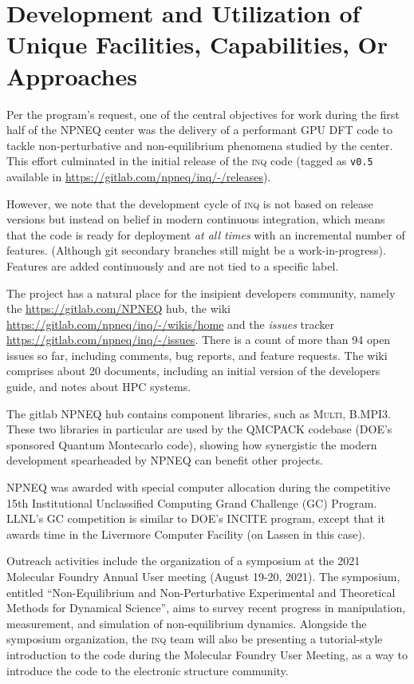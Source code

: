 \section{Development and Utilization of Unique Facilities, Capabilities, Or Approaches}
\label{sec:development}


Per the program's request, one of the central objectives for work during the first half of the NPNEQ center was the delivery of a performant GPU DFT code to tackle non-perturbative and non-equilibrium phenomena studied by the center.
This effort culminated in the initial release of the \textsc{inq} code (tagged as \texttt{v0.5} available in \url{https://gitlab.com/npneq/inq/-/releases}).

However, we note that the development cycle of \textsc{inq} is not based on release versions but instead on belief in modern continuous integration, which means that the code is ready for deployment \emph{at all times} with an incremental number of features.
(Although git secondary branches still might be a work-in-progress).
Features are added continuously and are not tied to a specific label.

The project has a natural place for the insipient developers community, namely the \url{https://gitlab.com/NPNEQ} hub, the wiki \url{https://gitlab.com/npneq/inq/-/wikis/home} and the \emph{issues} tracker \url{https://gitlab.com/npneq/inq/-/issues}.
There is a count of more than 94 open issues so far, including comments, bug reports, and feature requests.
The wiki comprises about 20 documents, including an initial version of the developers guide, and notes about HPC systems.

The gitlab NPNEQ hub contains component libraries, such as \textsc{Multi}, \textsc{B.MPI3}.
These two libraries in particular are used by the QMCPACK codebase (DOE's sponsored Quantum Montecarlo code), showing how synergistic the modern development spearheaded by NPNEQ can benefit other projects.

NPNEQ was awarded with special computer allocation during the competitive 15th
Institutional Unclassified Computing Grand Challenge (GC) Program.
LLNL's GC competition is similar to DOE's INCITE program, except that it awards time in the Livermore Computer Facility (on Lassen in this case).

Outreach activities include the organization of a symposium at the 2021 Molecular Foundry Annual User meeting (August 19-20, 2021). 
The symposium, entitled ``Non-Equilibrium and Non-Perturbative Experimental and Theoretical Methods for Dynamical Science'', aims to survey recent progress in manipulation, measurement, and simulation of non-equilibrium dynamics.
Alongside the symposium organization, the \textsc{inq} team will also be presenting a tutorial-style introduction to the code during the Molecular Foundry User Meeting, as a way to introduce the code to the electronic structure community.

